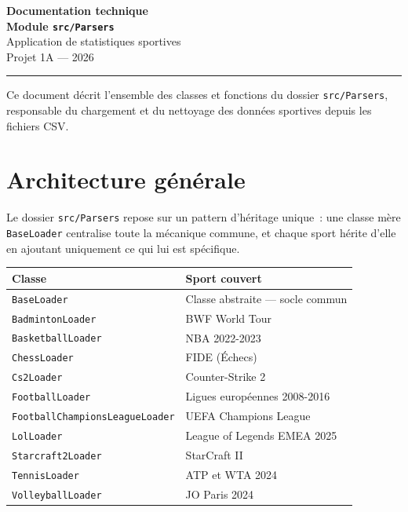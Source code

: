 \documentclass[12pt,a4paper]{article}
\begin{document}
\begin{titlepage}
    \centering
    \vspace*{3cm}
    {\huge\bfseries Documentation technique\\[0.5em]}
    {\Large\bfseries Module \texttt{src/Parsers}\\[2em]}
    {\large Application de statistiques sportives\\[1em]}
    {\normalsize Projet 1A — 2026\\[3em]}
    \hrule
    \vspace{1em}
    {\small Ce document décrit l'ensemble des classes et fonctions du dossier
    \texttt{src/Parsers}, responsable du chargement et du nettoyage des données
    sportives depuis les fichiers CSV.}
\end{titlepage}

\tableofcontents
\newpage

\section{Architecture générale}

Le dossier \texttt{src/Parsers} repose sur un pattern d'héritage unique~:
une classe mère \texttt{BaseLoader} centralise toute la mécanique commune,
et chaque sport hérite d'elle en ajoutant uniquement ce qui lui est spécifique.

\begin{center}
\begin{tabular}{l l}
\toprule
\textbf{Classe} & \textbf{Sport couvert} \\
\midrule
\texttt{BaseLoader} & Classe abstraite — socle commun \\
\texttt{BadmintonLoader} & BWF World Tour \\
\texttt{BasketballLoader} & NBA 2022-2023 \\
\texttt{ChessLoader} & FIDE (Échecs) \\
\texttt{Cs2Loader} & Counter-Strike 2 \\
\texttt{FootballLoader} & Ligues européennes 2008-2016 \\
\texttt{FootballChampionsLeagueLoader} & UEFA Champions League \\
\texttt{LolLoader} & League of Legends EMEA 2025 \\
\texttt{Starcraft2Loader} & StarCraft II \\
\texttt{TennisLoader} & ATP et WTA 2024 \\
\texttt{VolleyballLoader} & JO Paris 2024 \\
\bottomrule
\end{tabular}
\end{center}
\end{document}
